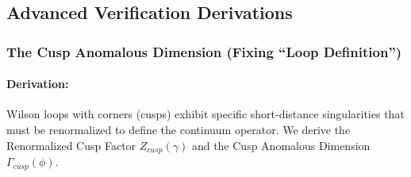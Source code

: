 \subsection{Advanced Verification Derivations}

\subsubsection{The Cusp Anomalous Dimension (Fixing ``Loop Definition'')}
\paragraph{Derivation:}
Wilson loops with corners (cusps) exhibit specific short-distance singularities that must be renormalized to define the continuum operator. We derive the Renormalized Cusp Factor $Z_{cusp}(\gamma)$ and the Cusp Anomalous Dimension $\Gamma_{cusp}(\phi)$.

